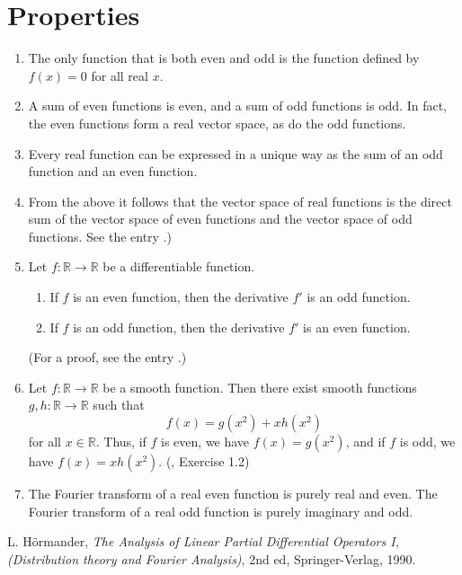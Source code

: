 \documentclass[12pt]{article}
\newcommand{\sR}[0]{\mathbb{R}}
\begin{document}
\section*{Properties}
\begin{enumerate}
\item
The only function that is both even and odd
is the function defined by $f(x)=0$ for all real $x$.
\item
A sum of even functions is even, and a sum of odd functions is odd.
In fact, the even functions form a real vector space,
as do the odd functions.
\item
Every real function can be expressed in a unique way
as the sum of an odd function and an even function.
\item
From the above it follows that
the vector space of real functions is the direct sum of 
the vector space of even functions and the vector space of odd functions.
See the entry
.)
\item 
Let $f\colon\mathbb{R}\to \mathbb{R}$ be a differentiable function.
\begin{enumerate}
\item
If $f$ is an even function, then the derivative $f'$ is an odd function.
\item
If $f$ is an odd function, then the derivative $f'$ is an even function.
\end{enumerate}
(For a proof, see the entry
.)
\item Let $f\colon\sR\to \sR$ be a smooth function.
Then there exist smooth functions $g,h\colon\sR\to\sR$ such that
\[
  f(x) = g(x^2)+ xh(x^2)
\]
for all $x\in \sR$.
Thus, if $f$ is even, we have $f(x)=g(x^2)$,
and if $f$ is odd, we have $f(x)=xh(x^2)$.
(\cite{hormander}, Exercise 1.2)
\item
The Fourier transform of a real even function is purely real and even.
The Fourier transform of a real odd function is purely imaginary and odd.
\end{enumerate}

\begin{thebibliography}{9}
L. H\"ormander, \emph{The Analysis of Linear Partial Differential Operators I,
(Distribution theory and Fourier Analysis)}, 2nd ed, Springer-Verlag, 1990.
 \end{thebibliography}
\end{document}
